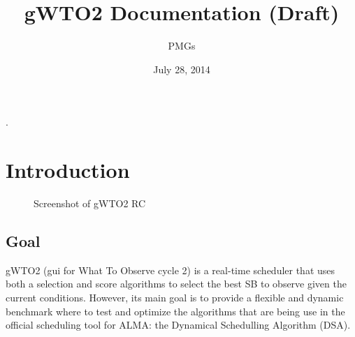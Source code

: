 \documentclass[a4paper,10pt,english]{sphinxmanual}
\title{gWTO2 Documentation (Draft)}
\date{July 28, 2014}
\author{PMGs}
\begin{document}
\maketitle
\tableofcontents
{}\label{index::doc}


.


\chapter{Introduction}
\label{intro2:introduction}\label{intro2:gwto2-documentation-contents}\label{intro2::doc}\begin{figure}[htbp]
\centering
\capstart

\caption{Screenshot of gWTO2 RC}\end{figure}


\section{Goal}
\label{intro2:goal}
gWTO2 (gui for What To Observe cycle 2) is a real-time scheduler that uses both
a selection and score algorithms to select the best SB to observe given the
current conditions. However, its main goal is to provide a flexible and dynamic
benchmark where to test and optimize the algorithms that are being use in the
official scheduling tool for ALMA: the Dynamical Schedulling Algorithm (DSA).
\end{document}
